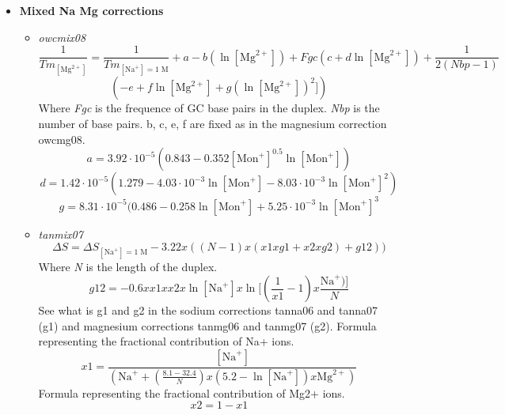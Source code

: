 \documentclass{article}
\begin{document}
\begin{itemize}
\item \textbf{Mixed Na Mg corrections} 
 \begin{itemize}
 \item \textit{owcmix08}
 \begin{displaymath}
 \frac{1}{Tm_{[\mbox{Mg}^{2+}]}} = \frac{1}{Tm_{[\mbox{Na}^+]=1\;\mathrm{M}}} + a
 - b (\ln [\mbox{Mg}^{2+}]) + Fgc (c + d \ln [\mbox{Mg}^{2+}]) + \frac{1}{2 (Nbp-1)} 
 \end{displaymath}
 \begin{displaymath}
 (-e + f \ln [\mbox{Mg}^{2+}] + g (\ln [\mbox{Mg}^{2+}])^{2}])
 \end{displaymath}
 Where \emph{Fgc} is the frequence of GC base pairs in the duplex.
 \emph{Nbp} is the number of base pairs.
 b, c, e, f are fixed as in the magnesium correction owcmg08.
 \begin{displaymath}
 a = 3.92\cdot{}10^{-5} (0.843 - 0.352 [\mbox{Mon}^+]^{0.5} \ln [\mbox{Mon}^+]) 
 \end{displaymath}
 \begin{displaymath}
 d = 1.42\cdot{}10^{-5} (1.279 - 4.03\cdot{}10^{-3} \ln [\mbox{Mon}^+] -
 8.03\cdot{}10^{-3} \ln [\mbox{Mon}^+]^{2})
 \end{displaymath}
 \begin{displaymath}
 g = 8.31\cdot{}10^{-5} (0.486 - 0.258 \ln [\mbox{Mon}^+] + 5.25\cdot{}10^{-3}
 \ln [\mbox{Mon}^+]^{3} 
 \end{displaymath}
 \item \textit{tanmix07}
 \begin{displaymath}
 \Delta{}S=\Delta{}S_{[\mbox{Na}^+]=1\;\mathrm{M}}- 3.22 x ((N - 1) x (x1 x g1 + x2 x g2) + g12))  
 \end{displaymath}
 Where \emph{N} is the length of the duplex.
 \begin{displaymath}
  g12 = -0.6 x x1 x x2 x \ln [\mbox{Na}^+] x \ln [(\frac{1}{x1} - 1) x \frac{\mbox{Na}^+)]}{N}  
 \end{displaymath}
  See what is g1 and g2 in the sodium corrections tanna06 and tanna07 (g1) and
  magnesium corrections tanmg06 and tanmg07 (g2).
  Formula representing the fractional contribution of Na+ ions.
 \begin{displaymath}
  x1 = \frac{[\mbox{Na}^+]}{(\mbox{Na}^+ + (\frac{8.1 - 32.4}{N}) x (5.2 - \ln [\mbox{Na}^+]) x \mbox{Mg}^{2+})}  
 \end{displaymath}
 Formula representing the fractional contribution of Mg2+ ions.
 \begin{displaymath}
  x2= 1-x1  
 \end{displaymath}
 \end{itemize}
\end{itemize}
\end{document}
